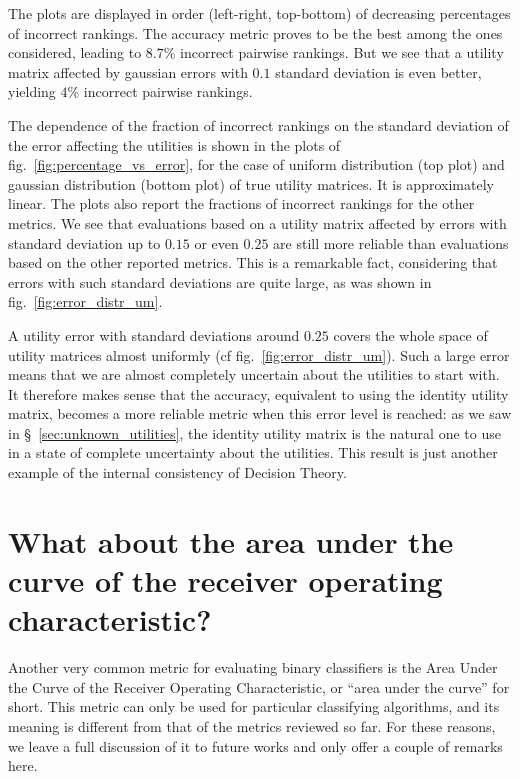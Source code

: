 \documentclass[\ifafour a4paper,12pt,\else a5paper,10pt,\fi%
onecolumn,oneside,article,%
british%
]{memoir}
\theoremstyle{remark}
\theoremstyle{innote}
\renewcommand*{\|}[1][]{\nonscript\:#1\vert\nonscript\:\mathopen{}}
\newcommand*{\sect}{\S}%
\newcommand*{\fig}{fig.}%
\begin{document}
The plots are displayed in order (left-right, top-bottom) of decreasing percentages of incorrect rankings. The accuracy metric proves to be the best among the ones considered, leading to $8.7\%$ incorrect pairwise rankings. But we see that a utility matrix affected by gaussian errors with $0.1$ standard deviation is even better, yielding $4\%$ incorrect pairwise rankings.

The dependence of the fraction of incorrect rankings on the standard deviation of the error affecting the utilities is shown in the plots of \fig~\ref{fig:percentage_vs_error}, for the case of uniform distribution (top plot) and gaussian distribution (bottom plot) of true utility matrices. It is approximately linear. The plots also report the fractions of incorrect rankings for the other metrics. We see that evaluations based on a utility matrix affected by errors with standard deviation up to $0.15$ or even $0.25$ are still more reliable than evaluations based on the other reported metrics. This is a remarkable fact, considering that errors with such standard deviations are quite large, as was shown in \fig~\ref{fig:error_distr_um}.

A utility error with standard deviations around $0.25$ covers the whole space of utility matrices almost uniformly (cf \fig~\ref{fig:error_distr_um}). Such a large error means that we are almost completely uncertain about the utilities to start with. It therefore makes sense that the accuracy, equivalent to using the identity utility matrix, becomes a more reliable metric when this error level is reached: as we saw in \sect~\ref{sec:unknown_utilities}, the identity utility matrix is the natural one to use in a state of complete uncertainty about the utilities. This result is just another example of the internal consistency of Decision Theory.


\section{What about the area under the curve of the receiver operating characteristic?}
\label{sec:auc}

Another very common metric for evaluating binary classifiers is the Area Under the Curve of the Receiver Operating Characteristic, or \enquote{area under the curve} for short. This metric can only be used for particular classifying algorithms, and its meaning is different from that of the metrics reviewed so far. For these reasons, we leave a full discussion of it to future works and only offer a couple of remarks here.
\end{document}
